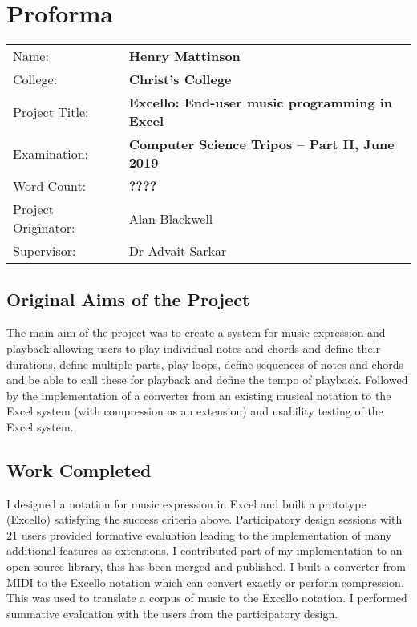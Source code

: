 \chapter*{Proforma}

{\large
\begin{tabular}{ll}
Name:               & \bf Henry Mattinson                      \\
College:            & \bf Christ's College                     \\
Project Title:      & \bf Excello: End-user music programming in Excel \\
Examination:        & \bf Computer Science Tripos -- Part II, June 2019  \\
Word Count:         & \bf ????\footnotemark[1]  \\
Project Originator: & Alan Blackwell                    \\
Supervisor:         & Dr Advait Sarkar                    \\
\end{tabular}
}


\section*{Original Aims of the Project}

The main aim of the project was to create a system for music expression and playback allowing users to play individual notes and chords and define their durations, define multiple parts, play loops, define sequences of notes and chords and be able to call these for playback and define the tempo of playback. Followed by the implementation of a converter from an existing musical notation to the Excel system (with compression as an extension) and usability testing of the Excel system.

\section*{Work Completed}

I designed a notation for music expression in Excel and built a prototype (Excello) satisfying the success criteria above. Participatory design sessions with 21 users provided formative evaluation leading to the implementation of many additional features as extensions. I contributed part of my implementation to an open-source library, this has been merged and published. I built a converter from MIDI to the Excello notation which can convert exactly or perform compression. This was used to translate a corpus of music to the Excello notation. I performed summative evaluation with the users from the participatory design.

